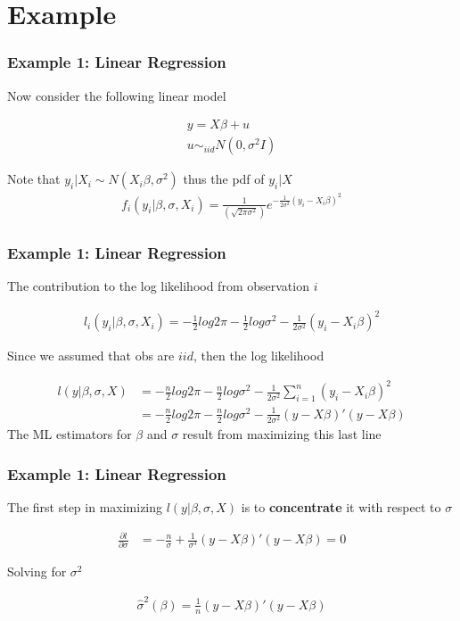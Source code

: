 \documentclass[
  shownotes,
  xcolor={svgnames},
  hyperref={colorlinks,citecolor=DarkBlue,linkcolor=DarkRed,urlcolor=DarkBlue}
  , aspectratio=169]{beamer}
\begin{document}
\section{Example}
\begin{frame}[fragile]
\frametitle{Example 1: Linear Regression}

Now consider the following linear model 
\medskip

\begin{align}
y=X\beta+u \\
u\sim_{iid} N(0,\sigma^2I)
\end{align}

\medskip
Note that $y_i|X_i\sim N(X_i\beta,\sigma^2)$ thus the pdf of $y_i|X$
\medskip
\begin{align}
f_i(y_i|\beta,\sigma,X_i)=\frac{1}{(\sqrt{2\pi\sigma^2})}e^{-\frac{1}{2\sigma^2}(y_i-X_i\beta)^2}
\end{align}


\end{frame}

\begin{frame}[fragile]
\frametitle{Example 1: Linear Regression}
The contribution to the log likelihood from observation $i$

\begin{align}
l_i(y_i|\beta,\sigma,X_i)=-\frac{1}{2}log 2 \pi-\frac{1}{2}log\sigma^2-\frac{1}{2\sigma^2}(y_i-X_i\beta)^2
\end{align}

Since we assumed that obs are $iid$, then the log likelihood

\begin{align}
l(y|\beta,\sigma,X) &=-\frac{n}{2}log 2 \pi-\frac{n}{2}log\sigma^2-\frac{1}{2\sigma^2}\sum_{i=1}^n(y_i-X_i\beta)^2  \\
&=-\frac{n}{2}log 2 \pi-\frac{n}{2}log\sigma^2-\frac{1}{2\sigma^2}(y-X\beta)'(y-X\beta)
\end{align}
The ML estimators for $\beta$ and $\sigma$ result from maximizing this last line

\end{frame}
\begin{frame}[fragile]
\frametitle{Example 1: Linear Regression}


The first step in maximizing $l(y|\beta,\sigma,X)$ is to {\bf concentrate} it with respect to $\sigma$

\begin{align}
\frac{\partial l}{\partial \sigma}&=-\frac{n}{\sigma}+\frac{1}{\sigma^3}(y-X\beta)'(y-X\beta)=0
\end{align}

Solving for $\sigma^2$

\begin{align}
\hat \sigma^2(\beta) = \frac{1}{n}(y-X\beta)'(y-X\beta)
\end{align}

\end{frame}
\end{document}
